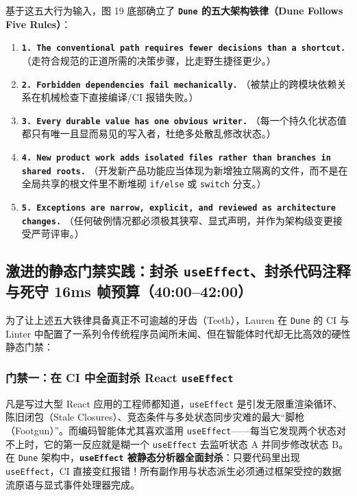 \documentclass[a4paper]{article}
\begin{document}
基于这五大行为输入，图 19 底部确立了 \textbf{\texttt{Dune} 的五大架构铁律（Dune Follows Five Rules）}：
\begin{enumerate}
  \item \textbf{\texttt{1. The conventional path requires fewer decisions than a shortcut.}}
  （走符合规范的正道所需的决策步骤，比走野生捷径更少。）
  \item \textbf{\texttt{2. Forbidden dependencies fail mechanically.}}
  （被禁止的跨模块依赖关系在机械检查下直接编译/CI 报错失败。）
  \item \textbf{\texttt{3. Every durable value has one obvious writer.}}
  （每一个持久化状态值都只有唯一且显而易见的写入者，杜绝多处散乱修改状态。）
  \item \textbf{\texttt{4. New product work adds isolated files rather than branches in shared roots.}}
  （开发新产品功能应当体现为新增独立隔离的文件，而不是在全局共享的根文件里不断堆砌 \texttt{if/else} 或 \texttt{switch} 分支。）
  \item \textbf{\texttt{5. Exceptions are narrow, explicit, and reviewed as architecture changes.}}
  （任何破例情况都必须极其狭窄、显式声明，并作为架构级变更接受严苛评审。）
\end{enumerate}

\subsection{激进的静态门禁实践：封杀 \texttt{useEffect}、封杀代码注释与死守 16ms 帧预算（40:00--42:00）}

为了让上述五大铁律具备真正不可逾越的牙齿（Teeth），Lauren 在 \texttt{Dune} 的 CI 与 Linter 中配置了一系列令传统程序员闻所未闻、但在智能体时代却无比高效的硬性静态门禁：

\subsubsection{门禁一：在 CI 中全面封杀 React \texttt{useEffect}}
凡是写过大型 React 应用的工程师都知道，\texttt{useEffect} 是引发无限重渲染循环、陈旧闭包（Stale Closures）、竞态条件与多处状态同步灾难的最大“脚枪（Footgun）”。而编码智能体尤其喜欢滥用 \texttt{useEffect}——每当它发现两个状态对不上时，它的第一反应就是糊一个 \texttt{useEffect} 去监听状态 A 并同步修改状态 B。
在 \texttt{Dune} 架构中，\textbf{\texttt{useEffect} 被静态分析器全面封杀}：只要代码里出现 \texttt{useEffect}，CI 直接变红报错！所有副作用与状态派生必须通过框架受控的数据流原语与显式事件处理器完成。
\end{document}
